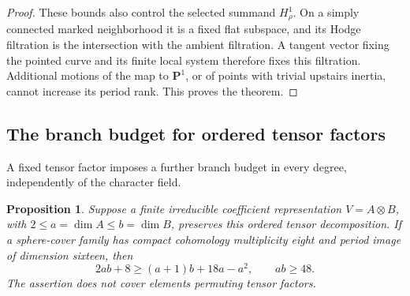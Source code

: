 \documentclass[11pt]{article}
\newtheorem{proposition}[theorem]{Proposition}
\theoremstyle{definition}
\theoremstyle{remark}
\begin{document}
\begin{proof}
These bounds also control the selected summand $H^1_\rho$.
On a simply connected marked neighborhood it is a fixed flat
subspace, and its Hodge filtration is the intersection with the
ambient filtration. A tangent vector fixing the pointed curve
and its finite local system therefore fixes this filtration.
Additional motions of the map to $\mathbf P^1$, or of points
with trivial upstairs inertia, cannot increase its period rank.
This proves the theorem.
\end{proof}


\subsection{The branch budget for ordered tensor factors}

A fixed tensor factor imposes a further branch budget in every degree,
independently of the character field.

\begin{proposition}\label{prop:ordered-tensor48}
Suppose a finite irreducible coefficient representation
$V=A\otimes B$, with $2\le a=\dim A\le b=\dim B$, preserves this
ordered tensor decomposition.  If a sphere-cover family has compact
cohomology multiplicity eight and period image of dimension sixteen,
then
\[
 2ab+8\ge(a+1)b+18a-a^2,\qquad ab\ge48.
\]
The assertion does not cover elements permuting tensor factors.
\end{proposition}
\end{document}
